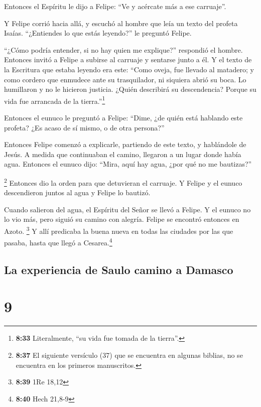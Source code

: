  Entonces el Espíritu le dijo a Felipe: ``Ve y acércate
más a ese carruaje''.

 Y Felipe corrió hacia allá, y escuchó al hombre que leía
un texto del profeta Isaías. ``¿Entiendes lo que estás leyendo?'' le
preguntó Felipe.

 ``¿Cómo podría entender, si no hay quien me explique?''
respondió el hombre. Entonces invitó a Felipe a subirse al carruaje y
sentarse junto a él.  Y el texto de la Escritura que
estaba leyendo era este: ``Como oveja, fue llevado al matadero; y como
cordero que enmudece ante su trasquilador, ni siquiera abrió su boca.
 Lo humillaron y no le hicieron justicia. ¿Quién
describirá su descendencia? Porque su vida fue arrancada de la
tierra.''\footnote{\textbf{8:33} Literalmente, ``su vida fue tomada de
  la tierra''.}

 Entonces el eunuco le preguntó a Felipe: ``Dime, ¿de
quién está hablando este profeta? ¿Es acaso de sí mismo, o de otra
persona?''

 Entonces Felipe comenzó a explicarle, partiendo de este
texto, y hablándole de Jesús.  A medida que continuaban
el camino, llegaron a un lugar donde había agua. Entonces el eunuco
dijo: ``Mira, aquí hay agua, ¿por qué no me bautizas?''

 \footnote{\textbf{8:37} El siguiente versículo (37) que
  se encuentra en algunas biblias, no se encuentra en los primeros
  manuscritos.}  Entonces dio la orden para que
detuvieran el carruaje. Y Felipe y el eunuco descendieron juntos al agua
y Felipe lo bautizó.

 Cuando salieron del agua, el Espíritu del Señor se llevó
a Felipe. Y el eunuco no lo vio más, pero siguió su camino con alegría.
Felipe se encontró entonces en Azoto. \footnote{\textbf{8:39} 1Re 18,12}
 Y allí predicaba la buena nueva en todas las ciudades
por las que pasaba, hasta que llegó a Cesarea.\footnote{\textbf{8:40}
  Hech 21,8-9}

\hypertarget{la-experiencia-de-saulo-camino-a-damasco}{%
\subsection{La experiencia de Saulo camino a
Damasco}\label{la-experiencia-de-saulo-camino-a-damasco}}

\hypertarget{section-8}{%
\section{9}\label{section-8}}

